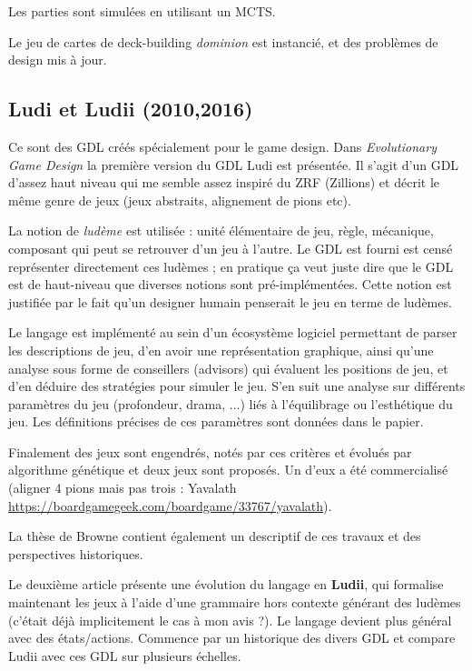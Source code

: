 \documentclass[a4paper,11pt]{article}
\begin{document}
Les parties sont simulées en utilisant un MCTS.

Le jeu de cartes de deck-building \emph{dominion} est instancié, et des problèmes de design mis à jour.






\subsection{ Ludi et Ludii (2010,2016) \cite{browne2010evolutionary, browne2016class} }

Ce sont des GDL créés spécialement pour le game design.
Dans {\it Evolutionary Game Design} \cite{browne2010evolutionary} la première version du GDL Ludi est présentée. Il s'agit d'un GDL d'assez haut niveau qui me semble assez inspiré du ZRF (Zillions) et décrit le même genre de jeux (jeux abstraits, alignement de pions etc).

La notion de {\it ludème} est utilisée : unité élémentaire de jeu, règle, mécanique, composant qui peut se retrouver d'un jeu à l'autre. Le GDL est fourni est censé représenter directement ces ludèmes ; en pratique ça veut juste dire que le GDL est de haut-niveau que diverses notions sont pré-implémentées. Cette notion est justifiée par le fait qu'un designer humain penserait le jeu en terme de ludèmes.

Le langage est implémenté au sein d'un écosystème logiciel permettant de parser les descriptions de jeu, d'en avoir une représentation graphique, ainsi qu'une analyse sous forme de conseillers (advisors) qui évaluent les positions de jeu, et d'en déduire des stratégies pour simuler le jeu.
S'en suit une analyse sur différents paramètres du jeu (profondeur, drama, ...) liés à l'équilibrage ou l'esthétique du jeu. Les définitions précises de ces paramètres sont données dans le papier.

Finalement des jeux sont engendrés, notés par ces critères et évolués par algorithme génétique et deux jeux sont proposés. Un d'eux a été commercialisé (aligner 4 pions mais pas trois : Yavalath \url{https://boardgamegeek.com/boardgame/33767/yavalath}).

La thèse de Browne \cite{browne2008thesis}  contient également un descriptif de ces travaux et des perspectives historiques. 


Le deuxième article \cite{browne2016class} présente une évolution du langage en {\bf Ludii}, qui formalise maintenant les jeux à l'aide d'une grammaire hors contexte générant des ludèmes (c'était déjà implicitement le cas à mon avis ?). Le langage devient plus général avec des états/actions. Commence par un historique des divers GDL et compare Ludii avec ces GDL sur plusieurs échelles. 
\end{document}

